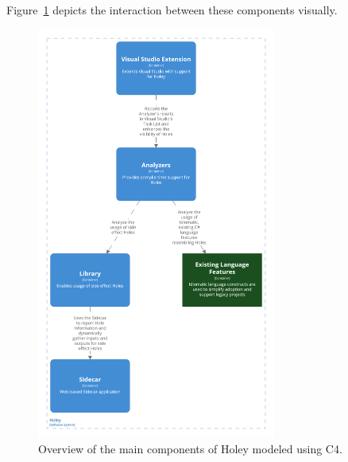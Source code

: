Figure~\ref{fig:holey-architecture} depicts the interaction between these components visually.
\begin{figure}[ht]
    \centering
    \includegraphics[width=0.7\textwidth]{images/holey-architecture}
    \caption{Overview of the main components of Holey modeled using C4.}
    \label{fig:holey-architecture}
\end{figure}

